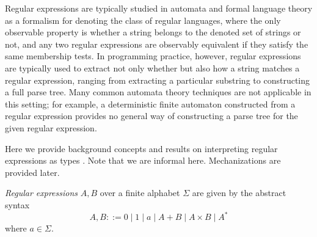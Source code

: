 %
Regular expressions are typically studied in automata and formal language theory as a formalism for denoting the class of regular languages, where the only observable property is whether a string belongs to the denoted set of strings or not, and any two regular expressions are observably equivalent if they satisfy the same membership tests.  In programming practice, however, regular expressions are typically used to extract not only whether but also how a string matches a regular expression, ranging from extracting a particular substring to constructing a full parse tree. Many common automata theory techniques are not applicable in this setting; for example, a deterministic finite automaton constructed from a regular expression provides no general way of constructing a parse tree for the given regular expression. 

Here we provide background concepts and results on interpreting 
regular expressions as types \cite{frca2004,HN11}. Note that we are
informal here.  Mechanizations are provided later.  
\begin{definition}
\emph{Regular expressions} $A, B$ over a finite alphabet $\Sigma$ are given by the abstract syntax
$$A, B ::= 0 \mid 1 \mid a \mid A + B \mid A \times B \mid A ^*$$
where $a \in \Sigma$. 
\end{definition}


